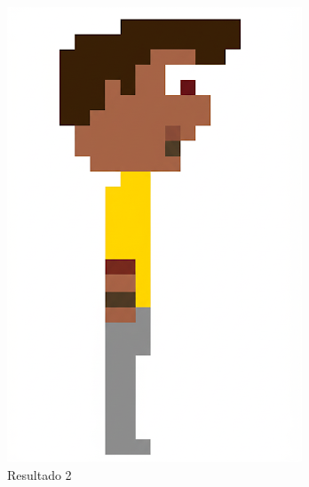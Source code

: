 \begin{figure}[htbp]
\begin{subfigure}{0.23\linewidth}
        \includegraphics[width=1\linewidth]{figs/geminiPro/chat5/tela1_res1.PNG}
        \caption{\small Resultado 2}
        \label{fig:geminiPro7b}
    \end{subfigure}
    \begin{subfigure}{0.23\linewidth}

\end{subfigure}
\end{figure}
